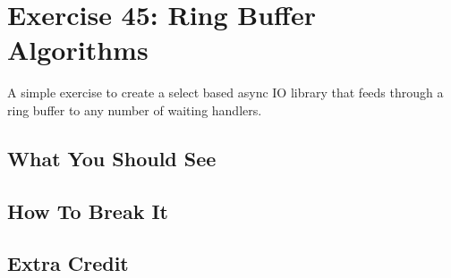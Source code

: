 \chapter{Exercise 45: Ring Buffer Algorithms}

A simple exercise to create a select based async IO library that feeds through a 
ring buffer to any number of waiting handlers.


\section{What You Should See}


\section{How To Break It}


\section{Extra Credit}



